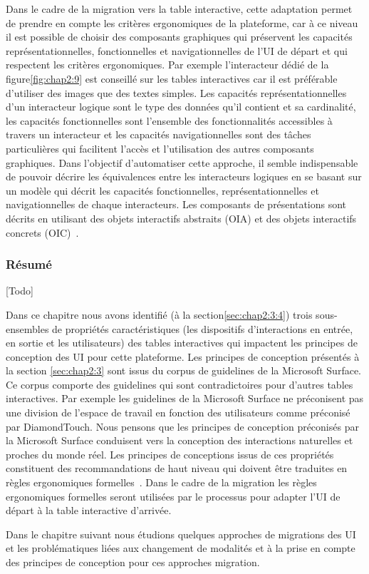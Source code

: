 Dans le cadre de la migration vers la table interactive, cette adaptation permet de prendre en compte les critères ergonomiques de la plateforme, car à ce niveau il est possible de choisir des composants graphiques qui préservent les capacités représentationnelles, fonctionnelles et navigationnelles de l'UI de départ et qui respectent les critères ergonomiques. Par exemple l'interacteur dédié de la figure\ref{fig:chap2:9} est conseillé sur les tables interactives car il est préférable d'utiliser des images que des textes simples. Les capacités représentationnelles d'un interacteur logique sont le type des données qu'il contient et sa cardinalité, les capacités fonctionnelles sont l'ensemble des fonctionnalités accessibles à travers un interacteur et les capacités navigationnelles sont des tâches particulières qui facilitent l'accès et l'utilisation des autres composants graphiques. 
Dans l'objectif d'automatiser cette approche, il semble indispensable de pouvoir décrire les équivalences entre les interacteurs logiques en se basant sur un modèle qui décrit les capacités fonctionnelles, représentationnelles et navigationnelles de chaque interacteurs. Les composants de présentations sont décrits en utilisant des objets interactifs abstraits (OIA) et des objets interactifs concrets (OIC)~\cite{Vanderdonckt1993}.

\subsubsection{Résumé}
[Todo]

Dans ce chapitre nous avons identifié (à la section\ref{sec:chap2:3:4}) trois sous-ensembles  de propriétés caractéristiques (les dispositifs d'interactions en entrée, en sortie et les utilisateurs) des tables interactives qui impactent les principes de conception des UI pour cette plateforme. Les principes de conception présentés à la section \ref{sec:chap2:3} sont issus du corpus de guidelines de la Microsoft Surface. Ce corpus comporte des guidelines qui sont contradictoires pour d'autres tables interactives. Par exemple les guidelines de la Microsoft Surface ne préconisent pas une division de l'espace de travail en fonction des utilisateurs comme préconisé par DiamondTouch. Nous pensons que les principes de conception préconisés par la Microsoft Surface conduisent vers la conception des interactions naturelles et proches du monde réel.
Les principes de conceptions issus de ces propriétés constituent des recommandations de haut niveau qui doivent être traduites en règles ergonomiques formelles~\cite{Vanderdonckt1997}. Dans le cadre de la migration les règles ergonomiques formelles seront utilisées par le processus pour adapter l'UI de départ à la table interactive d'arrivée.

Dans le chapitre suivant nous étudions quelques approches de migrations des UI et les problématiques liées aux changement de modalités et à la prise en compte des principes de conception pour ces approches migration.

